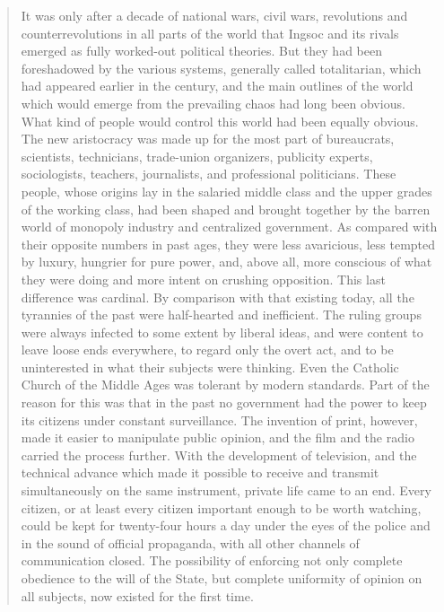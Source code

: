 \begin{paracol}{2}
\begin{quotation}
\switchcolumn*

It was only after a decade of national wars, civil wars, revolutions and
counterrevolutions in all parts of the world that Ingsoc and its rivals
emerged as fully worked-out political theories. But they had been
foreshadowed by the various systems, generally called totalitarian,
which had appeared earlier in the century, and the main outlines of the
world which would emerge from the prevailing chaos had long been
obvious. What kind of people would control this world had been equally
obvious. The new aristocracy was made up for the most part of
bureaucrats, scientists, technicians, trade-union organizers, publicity
experts, sociologists, teachers, journalists, and professional
politicians. These people, whose origins lay in the salaried middle
class and the upper grades of the working class, had been shaped and
brought together by the barren world of monopoly industry and
centralized government. As compared with their opposite numbers in past
ages, they were less avaricious, less tempted by luxury, hungrier for
pure power, and, above all, more conscious of what they were doing and
more intent on crushing opposition. This last difference was cardinal.
By comparison with that existing today, all the tyrannies of the past
were half-hearted and inefficient. The ruling groups were always
infected to some extent by liberal ideas, and were content to leave
loose ends everywhere, to regard only the overt act, and to be
uninterested in what their subjects were thinking. Even the Catholic
Church of the Middle Ages was tolerant by modern standards. Part of the
reason for this was that in the past no government had the power to keep
its citizens under constant surveillance. The invention of print,
however, made it easier to manipulate public opinion, and the film and
the radio carried the process further. With the development of
television, and the technical advance which made it possible to receive
and transmit simultaneously on the same instrument, private life came to
an end. Every citizen, or at least every citizen important enough to be
worth watching, could be kept for twenty-four hours a day under the eyes
of the police and in the sound of official propaganda, with all other
channels of communication closed. The possibility of enforcing not only
complete obedience to the will of the State, but complete uniformity of
opinion on all subjects, now existed for the first time.

\switchcolumn


\end{quotation}
\end{paracol}
